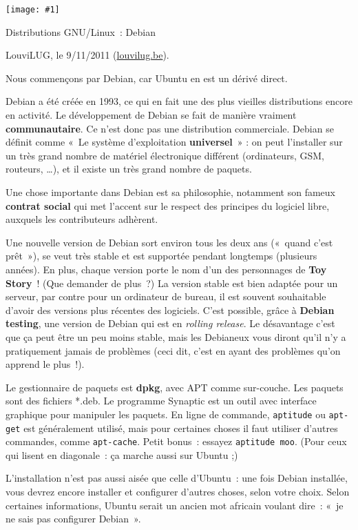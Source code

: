 \documentclass[a5paper,11pt]{article}
\def\titre#1#2{
  \noindent
  \begin{minipage}{0.14\linewidth}
  \texttt{[image: \#1]}
  \end{minipage}
  \begin{minipage}{0.85\linewidth}
    {\LARGE #2}

    \begin{flushright}
      LouviLUG, le 9/11/2011 (\url{louvilug.be}).
    \end{flushright}
  \end{minipage}

  \vspace{0.5cm}
}
\begin{document}
\pagebreak \titre{debian.pdf}{Distributions GNU/Linux~: Debian}

Nous commençons par Debian, car Ubuntu en est un dérivé direct.

\bigskip Debian a été créée en 1993, ce qui en fait une des plus vieilles
distributions encore en activité. Le développement de Debian se fait de manière
vraiment \textbf{communautaire}. Ce n'est donc pas une distribution commerciale. Debian se définit comme «~Le système d'exploitation \textbf{universel}~» : on peut l'installer sur un très grand nombre de matériel électronique différent (ordinateurs, GSM, routeurs, …), et il existe un très grand nombre de paquets.

\bigskip Une chose importante dans Debian est sa philosophie, notamment son
fameux \textbf{contrat social} qui met l'accent sur le respect des principes du
logiciel libre, auxquels les contributeurs adhèrent.

\bigskip Une nouvelle version de Debian sort environ tous les deux ans («~quand
c'est prêt~»), se veut très stable et est supportée pendant longtemps (plusieurs
années). En plus, chaque version porte le nom d'un des personnages de
\textbf{Toy Story}~! {\scriptsize (Que demander de plus~?)} La version stable
est bien adaptée pour un serveur, par contre pour un ordinateur de bureau, il
est souvent souhaitable d'avoir des versions plus récentes des logiciels. C'est
possible, grâce à \textbf{Debian testing}, une version de Debian qui est en
\textit{rolling release}. Le désavantage c'est que ça peut être un peu moins
stable, mais les Debianeux vous diront qu'il n'y a pratiquement jamais de
problèmes (ceci dit, c'est en ayant des problèmes qu'on apprend le plus~!). 

\bigskip Le gestionnaire de paquets est \textbf{dpkg}, avec APT comme
sur-couche. Les paquets sont des fichiers *.deb. Le programme Synaptic est un
outil avec interface graphique pour manipuler les paquets. En ligne de commande,
\texttt{aptitude} ou \texttt{apt-get} est généralement utilisé, mais pour
certaines choses il faut utiliser d'autres commandes, comme \texttt{apt-cache}.
Petit bonus~: essayez \texttt{aptitude moo}. {\scriptsize (Pour ceux qui lisent
en diagonale~: ça marche aussi sur Ubuntu ;)}

\bigskip L'installation n'est pas aussi aisée que celle d'Ubuntu~: une fois
Debian installée, vous devrez encore installer et configurer d'autres choses,
selon votre choix. Selon certaines informations, Ubuntu serait un ancien mot
africain voulant dire~: «~je ne sais pas configurer Debian~».
\end{document}
